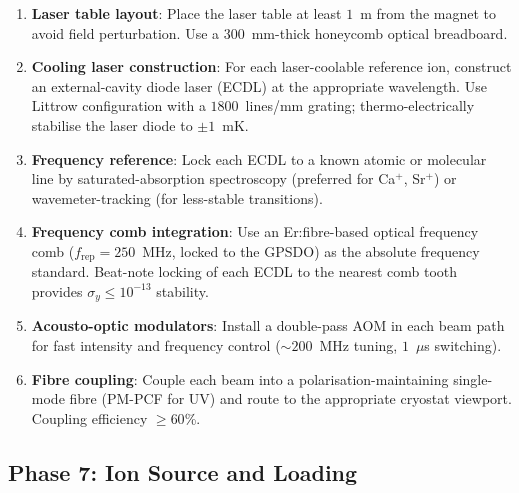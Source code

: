 \begin{enumerate}[leftmargin=1.5em]
    \item \textbf{Laser table layout}: Place the laser table at least $1$~m from the magnet to avoid field perturbation. Use a $300$~mm-thick honeycomb optical breadboard.
    \item \textbf{Cooling laser construction}: For each laser-coolable reference ion, construct an external-cavity diode laser (ECDL) at the appropriate wavelength. Use Littrow configuration with a $1800$~lines/mm grating; thermo-electrically stabilise the laser diode to $\pm 1$~mK.
    \item \textbf{Frequency reference}: Lock each ECDL to a known atomic or molecular line by saturated-absorption spectroscopy (preferred for Ca$^+$, Sr$^+$) or wavemeter-tracking (for less-stable transitions).
    \item \textbf{Frequency comb integration}: Use an Er:fibre-based optical frequency comb ($f_{\mathrm{rep}} = 250$~MHz, locked to the GPSDO) as the absolute frequency standard. Beat-note locking of each ECDL to the nearest comb tooth provides $\sigma_y \le 10^{-13}$ stability.
    \item \textbf{Acousto-optic modulators}: Install a double-pass AOM in each beam path for fast intensity and frequency control ($\sim$$200$~MHz tuning, $1$~$\mu$s switching).
    \item \textbf{Fibre coupling}: Couple each beam into a polarisation-maintaining single-mode fibre (PM-PCF for UV) and route to the appropriate cryostat viewport. Coupling efficiency $\ge 60$\%.
\end{enumerate}

\subsection{Phase 7: Ion Source and Loading}
\label{subsec:phase7_source}

